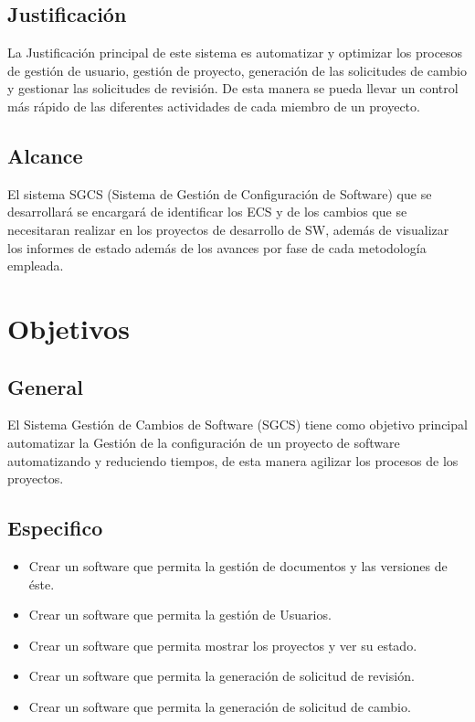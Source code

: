 \documentclass[twoside,twocolumn]{article}
\begin{document}
\subsection{Justificación}
La Justificación principal de este sistema es automatizar y optimizar los procesos de gestión de usuario, gestión de proyecto, generación de las solicitudes de cambio y gestionar las solicitudes de revisión.  De esta manera se pueda llevar un control más rápido de las diferentes actividades de cada miembro de un proyecto.

\subsection{Alcance}
El sistema SGCS (Sistema de Gestión de Configuración de Software) que se desarrollará se encargará de identificar los ECS y de los cambios que se necesitaran realizar en los proyectos de desarrollo de SW, además de visualizar los informes de estado además de los avances por fase de cada metodología empleada.


\section{Objetivos}\label{sec:5}

\subsection{General}
El Sistema Gestión de Cambios de Software (SGCS) tiene como objetivo principal automatizar la Gestión de la configuración de un proyecto de software automatizando y reduciendo tiempos, de esta manera agilizar los procesos de los proyectos.
\subsection{Especifico}
\begin{itemize}	
	\item Crear un software que permita la gestión de documentos y las versiones de éste.
	\item Crear un software que permita la gestión de Usuarios.
	\item Crear un software que permita mostrar los proyectos y ver su estado.
	\item Crear un software que permita la generación de solicitud de revisión.
	\item Crear un software que permita la generación de solicitud de cambio.
\end{itemize} 
\end{document}

